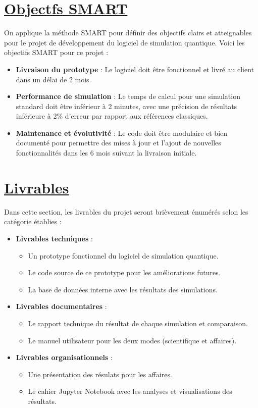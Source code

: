 \documentclass[11pt]{article}
\begin{document}
\section{\underline{Objectfs SMART}}
On applique la méthode SMART pour définir des objectifs clairs et atteignables pour le projet de développement du logiciel de simulation quantique. Voici les objectifs SMART pour ce projet :

\begin{itemize}
  \item \textbf{Livraison du prototype} : Le logiciel doit être fonctionnel et livré au client dans un délai de 2 mois.
  \item \textbf{Performance de simulation} : Le temps de calcul pour une simulation standard doit être inférieur à 2 minutes, avec une précision de résultats inférieure à 2\% d'erreur par rapport aux références classiques.
  \item \textbf{Maintenance et évolutivité} : Le code doit être modulaire et bien documenté pour permettre des mises à jour et l'ajout de nouvelles fonctionnalités dans les 6 mois suivant la livraison initiale.
\end{itemize}

\section{\underline{Livrables}}
Dans cette section, les livrables du projet seront brièvement énumérés selon les catégorie établies :

\begin{itemize}
  \item \textbf{Livrables techniques} :
    \begin{itemize}
      \item Un prototype fonctionnel du logiciel de simulation quantique.
      \item Le code source de ce prototype pour les améliorations futures.
      \item La base de données interne avec les résultats des simulations.
    \end{itemize}
  \item \textbf{Livrables documentaires} :
    \begin{itemize}
      \item Le rapport technique du résultat de chaque simulation et comparaison.
      \item Le manuel utilisateur pour les deux modes (scientifique et affaires).
    \end{itemize}
  \item \textbf{Livrables organisationnels} :
    \begin{itemize}
      \item Une présentation des résulats pour les affaires.
      \item Le cahier Jupyter Notebook avec les analyses et visualisations des résultats.
    \end{itemize}
\end{itemize}
\end{document}
